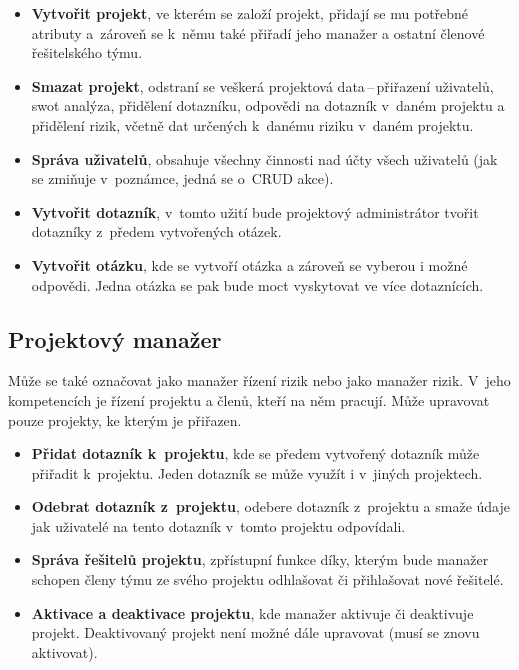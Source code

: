 \begin{itemize}
    \item \textbf{Vytvořit projekt}, ve kterém se založí projekt, přidají se mu potřebné atributy a~zároveň se k~němu také přiřadí jeho manažer a ostatní členové řešitelského týmu.
    \item \textbf{Smazat projekt}, odstraní se veškerá projektová data\,--\,přiřazení uživatelů, swot analýza, přidělení dotazníku, odpovědi na dotazník v~daném projektu a přidělení rizik, včetně dat určených k~danému riziku v~daném projektu.
    \item \textbf{Správa uživatelů}, obsahuje všechny činnosti nad účty všech uživatelů (jak se zmiňuje v~poznámce, jedná se o~CRUD akce).
    \item \textbf{Vytvořit dotazník}, v~tomto užití bude projektový administrátor tvořit dotazníky z~předem vytvořených otázek. 
    \item \textbf{Vytvořit otázku}, kde se vytvoří otázka a zároveň se vyberou i možné odpovědi. Jedna otázka se pak bude moct vyskytovat ve více dotaznících. 
\end{itemize}

\subsection*{Projektový manažer}

Může se také označovat jako manažer řízení rizik nebo jako manažer rizik. V~jeho kompetencích je řízení projektu a členů, kteří na něm pracují. Může upravovat pouze projekty, ke kterým je přiřazen.

\begin{itemize}
    \item \textbf{Přidat dotazník k~projektu}, kde se předem vytvořený dotazník může přiřadit k~projektu. Jeden dotazník se může využít i v~jiných projektech.  
        \item \textbf{Odebrat dotazník z~projektu}, odebere dotazník z~projektu a smaže údaje jak uživatelé na tento dotazník v~tomto projektu odpovídali.
    \item \textbf{Správa řešitelů projektu}, zpřístupní funkce díky, kterým bude manažer schopen členy týmu ze svého projektu odhlašovat či přihlašovat nové řešitelé.
    \item \textbf{Aktivace a deaktivace projektu}, kde manažer aktivuje či deaktivuje projekt. Deaktivovaný projekt není možné dále upravovat (musí se znovu aktivovat).
\end{itemize}

